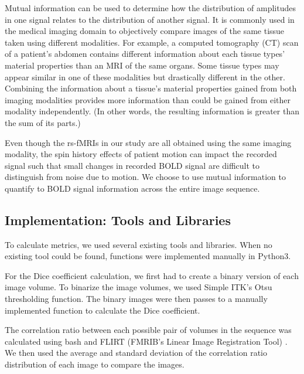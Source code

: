 Mutual information can be used to determine how the distribution of amplitudes in one signal relates to the distribution of another signal. It is commonly used in the medical imaging domain to objectively compare images of the same tissue taken using different modalities. For example, a computed tomography (CT) scan of a patient's abdomen contains different information about each tissue types' material properties than an MRI of the same organs. Some tissue types may appear similar in one of these modalities but drastically different in the other. Combining the information about a tissue's material properties gained from both imaging modalities provides more information than could be gained from either modality independently. (In other words, the resulting information is greater than the sum of its parts.)

Even though the rs-fMRIs in our study are all obtained using the same imaging modality, the spin history effects of patient motion can impact the recorded signal such that small changes in recorded BOLD signal are difficult to distinguish from noise due to motion. We choose to use mutual information to quantify to BOLD signal information across the entire image sequence.

\subsection{Implementation: Tools and Libraries}

To calculate metrics, we used several existing tools and libraries. When no existing tool could be found, functions were implemented manually in Python3. 

For the Dice coefficient calculation, we first had to create a binary version of each image volume. To binarize the image volumes, we used Simple ITK's Otsu thresholding function. The binary images were then passes to a manually implemented function to calculate the Dice coefficient.

The correlation ratio between each possible pair of volumes in the sequence was calculated using bash and FLIRT (FMRIB’s Linear Image Registration Tool) \cite{Jenkinson2001} \cite{Jenkinson2002}. We then used the average and standard deviation of the correlation ratio distribution of each image to compare the images.


